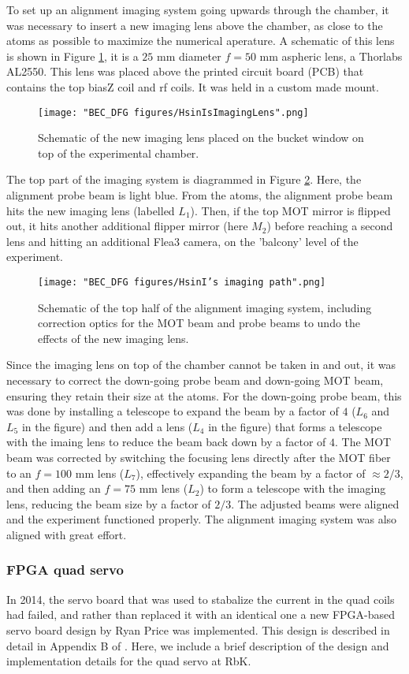 To set up an alignment imaging system going upwards through the chamber, it was necessary to insert a new imaging lens above the chamber, as close to the atoms as possible to maximize the numerical aperature. A schematic of this lens is shown in Figure \ref{fig:HsinIsImagingLens}, it is a $25$ mm diameter $f=50$ mm aspheric lens, a Thorlabs AL2550. This lens was placed above the printed circuit board (PCB) that contains the top biasZ coil and rf coils. It was held in a custom made mount. 
\begin{figure}
	\texttt{[image: "BEC\_DFG figures/HsinIsImagingLens".png]}
\caption{Schematic of the new imaging lens placed on the bucket window on top of the experimental chamber.}
\label{fig:HsinIsImagingLens}
\end{figure}

The top part of the imaging system is diagrammed in Figure \ref{fig:HsinIsImaging}. Here, the alignment probe beam is light blue. From the atoms, the alignment probe beam hits the new imaging lens (labelled $L_1$). Then, if the top MOT mirror is flipped out, it hits another additional flipper mirror (here $M_2$) before reaching a second lens and hitting an additional Flea3 camera, on the 'balcony' level of the experiment. 
\begin{figure}
	\texttt{[image: "BEC\_DFG figures/HsinI's imaging path".png]}
\caption{Schematic of the top half of the alignment imaging system, including correction optics for the MOT beam and probe beams to undo the effects of the new imaging lens.}
\label{fig:HsinIsImaging}
\end{figure}
Since the imaging lens on top of the chamber cannot be taken in and out, it was necessary to correct the down-going probe beam and down-going MOT beam, ensuring they retain their size at the atoms. For the down-going probe beam, this was done by installing a telescope to expand the beam by a factor of $4$ ($L_6$ and $L_5$ in the figure) and then add a lens ($L_4$ in the figure) that forms a telescope with the imaing lens to reduce the beam back down by a factor of $4$. The MOT beam was corrected by switching the focusing lens directly after the MOT fiber to an $f=100$ mm lens ($L_7$), effectively expanding the beam by a factor of $\approx2/3$, and then adding an $f=75$ mm lens ($L_2$) to form a telescope with the imaging lens, reducing the beam size by a factor of $2/3$. The adjusted beams were aligned and the experiment functioned properly. The alignment imaging system was also aligned with great effort.

\subsubsection{FPGA quad servo}
In 2014, the servo board that was used to stabalize the current in the quad coils had failed, and rather than replaced it with an identical one a new FPGA-based servo board design by Ryan Price was implemented. This design is described in detail in Appendix B of \cite{PriceThesis}. Here, we include a brief description of the design and implementation details for the quad servo at RbK.

